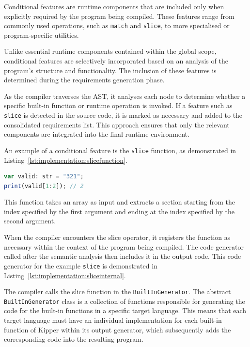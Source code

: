 Conditional features are runtime components that are included only when explicitly required by the program being compiled. These features range from commonly used operations, such as \lstinline|match| and \lstinline|slice|, to more specialised or program-specific utilities.

Unlike essential runtime components contained within the global scope, conditional features are selectively incorporated based on an analysis of the program's structure and functionality. The inclusion of these features is determined during the requirements generation phase.

As the compiler traverses the AST, it analyses each node to determine whether a specific built-in function or runtime operation is invoked. If a feature such as \lstinline|slice| is detected in the source code, it is marked as necessary and added to the consolidated requirements list. This approach ensures that only the relevant components are integrated into the final runtime environment.

An example of a conditional feature is the \lstinline|slice| function, as demonstrated in Listing~\ref{lst:implementation:slicefunction}.

\begin{lstlisting}[language=TypeScript,caption=The Slice operator being used on a string,label=lst:implementation:slicefunction]
var valid: str = "321";
print(valid[1:2]); // 2
\end{lstlisting}

This function takes an array as input and extracts a section starting from the index specified by the first argument and ending at the index specified by the second argument.

When the compiler encounters the slice operator, it registers the function as necessary within the context of the program being compiled. The code generator called after the semantic analysis then includes it in the output code. This code generator for the example \lstinline|slice| is demonstrated in Listing~\ref{lst:implementation:sliceinternal}.

The compiler calls the slice function in the \lstinline|BuiltInGenerator|. The abstract \lstinline|BuiltInGenerator| class is a collection of functions responsible for generating the code for the built-in functions in a specific target language. This means that each target language must have an individual implementation for each built-in function of Kipper within its output generator, which subsequently adds the corresponding code into the resulting program.

